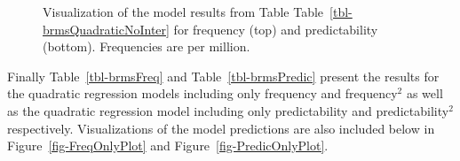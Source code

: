 \documentclass[
  authoryear,
  preprint,
  1p,
  onecolumn]{elsarticle}
\begin{document}
\begin{figure}


\caption{\label{fig-FullQuadraticPlot}Visualization of the model results
from Table Table~\ref{tbl-brmsQuadraticNoInter} for frequency (top) and
predictability (bottom). Frequencies are per million.}

\end{figure}%

Finally Table~\ref{tbl-brmsFreq} and Table~\ref{tbl-brmsPredic} present
the results for the quadratic regression models including only frequency
and frequency\(^2\) as well as the quadratic regression model including
only predictability and predictability\(^2\) respectively.
Visualizations of the model predictions are also included below in
Figure~\ref{fig-FreqOnlyPlot} and Figure~\ref{fig-PredicOnlyPlot}.

\begin{table}

\caption{\label{tbl-brmsFreq}Results for the Bayesian quadratic
regression model containing only frequency and frequency\(^2\).}


\end{table}%
\end{document}
